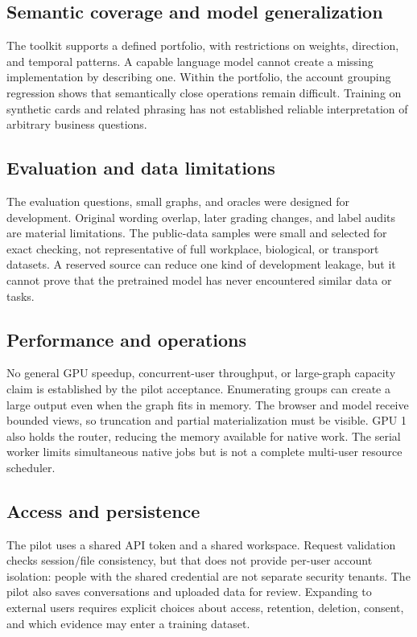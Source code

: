 \documentclass[11pt,a4paper]{article}
\begin{document}
\subsection{Semantic coverage and model generalization}
The toolkit supports a defined portfolio, with restrictions on weights,
direction, and temporal patterns. A capable language model cannot create a
missing implementation by describing one. Within the portfolio, the account
grouping regression shows that semantically close operations remain difficult.
Training on synthetic cards and related phrasing has not established reliable
interpretation of arbitrary business questions.

\subsection{Evaluation and data limitations}
The evaluation questions, small graphs, and oracles were designed for development.
Original wording overlap, later grading changes, and label audits are material
limitations. The public-data samples were small and selected for exact checking,
not representative of full workplace, biological, or transport datasets. A
reserved source can reduce one kind of development leakage, but it cannot prove
that the pretrained model has never encountered similar data or tasks.

\subsection{Performance and operations}
No general GPU speedup, concurrent-user throughput, or large-graph capacity claim
is established by the pilot acceptance. Enumerating groups can create a large
output even when the graph fits in memory. The browser and model receive bounded
views, so truncation and partial materialization must be visible. GPU 1 also
holds the router, reducing the memory available for native work. The serial
worker limits simultaneous native jobs but is not a complete multi-user
resource scheduler.

\subsection{Access and persistence}
The pilot uses a shared API token and a shared workspace. Request validation
checks session/file consistency, but that does not provide per-user account
isolation: people with the shared credential are not separate security tenants.
The pilot also saves conversations and uploaded data for review. Expanding to
external users requires explicit choices about access, retention, deletion,
consent, and which evidence may enter a training dataset.
\end{document}
